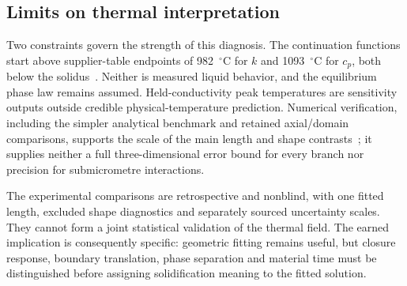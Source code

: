 \subsection{Limits on thermal interpretation}
Two constraints govern the strength of this diagnosis. The continuation functions start above supplier-table endpoints of 982~$^\circ$C for $k$ and 1093~$^\circ$C for $c_p$, both below the solidus~\cite{specialmetals625}. Neither is measured liquid behavior, and the equilibrium phase law remains assumed. Held-conductivity peak temperatures are sensitivity outputs outside credible physical-temperature prediction. Numerical verification, including the simpler analytical benchmark and retained axial/domain comparisons, supports the scale of the main length and shape contrasts~\cite{oberkampf2002}; it supplies neither a full three-dimensional error bound for every branch nor precision for submicrometre interactions.

The experimental comparisons are retrospective and nonblind, with one fitted length, excluded shape diagnostics and separately sourced uncertainty scales. They cannot form a joint statistical validation of the thermal field. The earned implication is consequently specific: geometric fitting remains useful, but closure response, boundary translation, phase separation and material time must be distinguished before assigning solidification meaning to the fitted solution.
